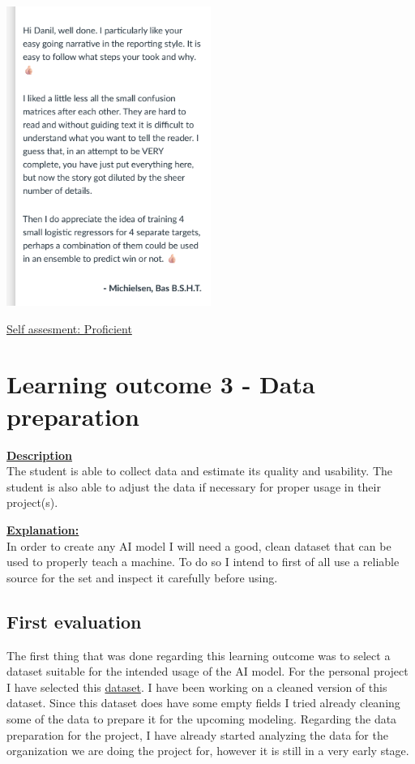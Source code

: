 \documentclass{article}
\begin{document}
	\begin{center}
	\includegraphics[width=0.5\textwidth]{images/Bas_feedback_report.png}
	\end{center}
	\underline{Self assesment: Proficient}

	\section{Learning outcome 3 - Data preparation}
	\underline{\textbf{Description}}\\
	The student is able to collect data and estimate its quality and usability. 
	The student is also able to adjust the data if necessary for proper usage in their project(s).
	
	\underline{\textbf{Explanation:}}\\
	In order to create any AI model I will need a good, clean dataset that can be used to properly teach a machine.
	To do so I intend to first of all use a reliable source for the set and inspect it carefully before using.
	
	\subsection{First evaluation}
	The first thing that was done regarding this learning outcome was to select a dataset suitable for the intended usage of the 
	AI model. For the personal project I have selected this \href{https://www.kaggle.com/datasets/asaniczka/ufc-fighters-statistics}{dataset}. I have been working on a cleaned version of this dataset. 
	Since this dataset does have some empty fields I tried already cleaning some of the data to prepare it for the upcoming modeling. Regarding the data preparation 
	for the project, I have already started analyzing the data for the organization we are doing the project for, however it is still in a very early stage.
	
\end{document}
